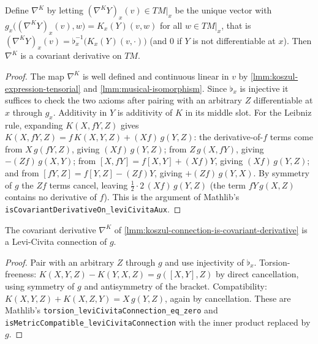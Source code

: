 \begin{lemma}
    \label{lmm:koszul-connection-is-covariant-derivative}
    \leanok
    Define $\nabla^K$ by letting $(\nabla^K Y)_x(v) \in TM|_x$ be the unique vector with $g_x\big((\nabla^K Y)_x(v), w\big) = K_x(Y)(v, w)$ for all $w \in TM|_x$, that is $(\nabla^K Y)_x(v) = \flat_x^{-1}\big(K_x(Y)(v,\cdot)\big)$ (and $0$ if $Y$ is not differentiable at $x$). Then $\nabla^K$ is a covariant derivative on $TM$.
\end{lemma}
\begin{proof}
    \leanok
    The map $\nabla^K$ is well defined and continuous linear in $v$ by \ref{lmm:koszul-expression-tensorial} and \ref{lmm:musical-isomorphism}. Since $\flat_x$ is injective it suffices to check the two axioms after pairing with an arbitrary $Z$ differentiable at $x$ through $g_x$. Additivity in $Y$ is additivity of $K$ in its middle slot. For the Leibniz rule, expanding $K(X, fY, Z)$ gives $K(X,fY,Z) = f\,K(X,Y,Z) + (Xf)\,g(Y,Z)$: the derivative-of-$f$ terms come from $X\,g(fY,Z)$, giving $(Xf)\,g(Y,Z)$; from $Z\,g(X,fY)$, giving $-(Zf)\,g(X,Y)$; from $[X,fY] = f[X,Y] + (Xf)Y$, giving $(Xf)\,g(Y,Z)$; and from $[fY,Z] = f[Y,Z] - (Zf)Y$, giving $+(Zf)\,g(Y,X)$. By symmetry of $g$ the $Zf$ terms cancel, leaving $\tfrac12 \cdot 2\,(Xf)\,g(Y,Z)$ (the term $fY\,g(X,Z)$ contains no derivative of $f$). This is the argument of Mathlib's \texttt{isCovariantDerivativeOn\_leviCivitaAux}.
\end{proof}

\begin{lemma}
    \label{lmm:koszul-connection-is-levi-civita}
    \leanok
    The covariant derivative $\nabla^K$ of \ref{lmm:koszul-connection-is-covariant-derivative} is a Levi-Civita connection of $g$.
\end{lemma}
\begin{proof}
    \leanok
    Pair with an arbitrary $Z$ through $g$ and use injectivity of $\flat_x$. Torsion-freeness: $K(X,Y,Z) - K(Y,X,Z) = g([X,Y],Z)$ by direct cancellation, using symmetry of $g$ and antisymmetry of the bracket. Compatibility: $K(X,Y,Z) + K(X,Z,Y) = X\,g(Y,Z)$, again by cancellation. These are Mathlib's \texttt{torsion\_leviCivitaConnection\_eq\_zero} and \texttt{isMetricCompatible\_leviCivitaConnection} with the inner product replaced by $g$.
\end{proof}

